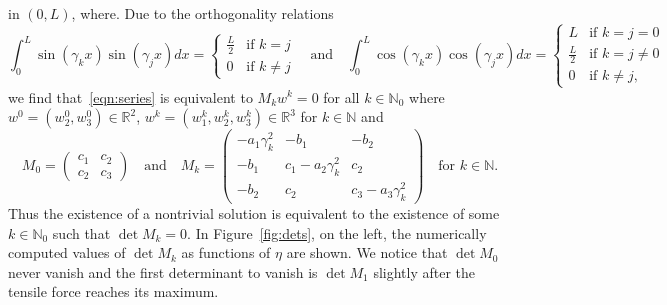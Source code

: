 \documentclass[a4paper,10pt,oneside]{amsbook}
\numberwithin{section}{chapter}
\numberwithin{equation}{chapter}
\theoremstyle{definition}
\begin{document}
in $(0,L)$, where. Due to the orthogonality relations
\[
\int_0^L\sin(\gamma_kx)\sin(\gamma_jx)dx=\begin{cases}
\frac{L}{2} & \text{if $k=j$} \\
0 & \text{if $k\neq j$}
\end{cases}\quad\text{and}\quad\int_0^L\cos(\gamma_kx)\cos(\gamma_jx)dx=\begin{cases}
L & \text{if $k=j=0$} \\
\frac{L}{2} & \text{if $k=j\neq0$} \\
0 & \text{if $k\neq j$},
\end{cases}
\]
we find that~\eqref{eqn:series} is equivalent to $M_kw^k=0$ for all $k\in\mathbb{N}_0$ where $w^0=(w_2^0,w_3^0)\in\mathbb{R}^2$, $w^k=(w_1^k,w_2^k,w_3^k)\in\mathbb{R}^3$ for $k\in\mathbb{N}$ and
\[
M_0=\begin{pmatrix}
c_1 & c_2 \\
c_2 & c_3
\end{pmatrix}\quad\text{and}\quad M_k=\begin{pmatrix}
-a_1\gamma_k^2 & -b_1 & -b_2 \\
-b_1 & c_1-a_2\gamma_k^2 & c_2 \\
-b_2 & c_2 & c_3-a_3\gamma_k^2
\end{pmatrix}\quad\text{for $k\in\mathbb{N}$}.
\]
Thus the existence of a nontrivial solution is equivalent to the existence of some $k\in\mathbb{N}_0$ such that $\det M_k=0$. In Figure~\ref{fig:dets}, on the left, the numerically computed values of $\det M_k$ as functions of $\eta$ are shown. We notice that $\det M_0$ never vanish and the first determinant to vanish is $\det M_1$ slightly after the tensile force reaches its maximum.
\end{document}
